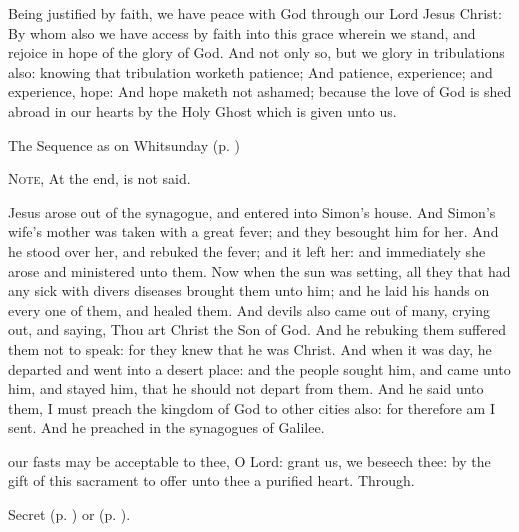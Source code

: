  Being justified by faith, we have peace with God through our Lord Jesus Christ: By whom also we have access by faith into this grace wherein we stand, and rejoice in hope of the glory of God. And not only so, but we glory in tribulations also: knowing that tribulation worketh patience; And patience, experience; and experience, hope: And hope maketh not ashamed; because the love of God is shed abroad in our hearts by the Holy Ghost which is given unto us.


\begin{rubric}
{The Sequence as on Whitsunday (p. \pageref{WhitSeq})}
\end{rubric}

\begin{rubric}
    \textsc{Note,} At the end,  is not said.
\end{rubric}

 Jesus arose out of the synagogue, and entered into Simon's house. And Simon's wife's mother was taken with a great fever; and they besought him for her. And he stood over her, and rebuked the fever; and it left her: and immediately she arose and ministered unto them. Now when the sun was setting, all they that had any sick with divers diseases brought them unto him; and he laid his hands on every one of them, and healed them. And devils also came out of many, crying out, and saying, Thou art Christ the Son of God. And he rebuking them suffered them not to speak: for they knew that he was Christ. And when it was day, he departed and went into a desert place: and the people sought him, and came unto him, and stayed him, that he should not depart from them. And he said unto them, I must preach the kingdom of God to other cities also: for therefore am I sent. And he preached in the synagogues of Galilee.


\secret
{} our fasts may be acceptable to thee, O Lord: grant us, we beseech thee: by the gift of this sacrament to offer unto thee a purified heart. Through.
\begin{rubric}
     Secret  (p. \pageref{SPAgainst}) or  (p. \pageref{SPChiefBishop}).
\end{rubric}


